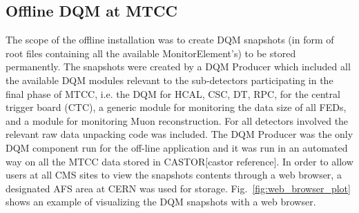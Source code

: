 \documentclass[a4paper]{cmspaper}
\begin{document}
\subsection{Offline DQM at MTCC} \label{sec:dqmcommissioningoffline}
The scope of the offline installation was to create DQM snapshots (in form of root files containing all the available MonitorElement's)
to be stored permanently. The snapshots were created by a DQM Producer which included all the available DQM 
modules relevant to the sub-detectors participating in the final phase of MTCC, i.e. the DQM for HCAL, CSC, DT, RPC, 
for the central trigger board (CTC), a generic module for monitoring the data size of all 
FEDs, and a module for monitoring Muon reconstruction. For all detectors involved the relevant raw data
unpacking code was included. The DQM Producer was the only DQM component run for the off-line application and it was
run in an automated way on all the MTCC data stored in CASTOR[castor reference]. In order to allow users at all CMS sites to view the
snapshots contents through a web browser, a designated AFS area at CERN was used for storage. Fig.~\ref{fig:web_browser_plot} shows an example of
visualizing the DQM snapshots with a web browser.
%
\end{document}
